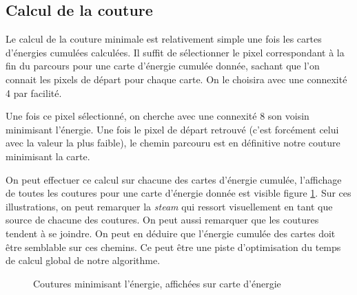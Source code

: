 \documentclass[a4paper]{article}
\begin{document}
\subsection{Calcul de la couture}

Le calcul de la couture minimale est relativement simple une fois les cartes d'énergies cumulées calculées. 
Il suffit de sélectionner le pixel correspondant à la fin du parcours pour une carte d'énergie cumulée donnée,
sachant que l'on connait les pixels de départ pour chaque carte. On le choisira avec une connexité 4 par
facilité.

Une fois ce pixel sélectionné, on cherche avec une connexité 8 son voisin minimisant l'énergie.
Une fois le pixel de départ retrouvé (c'est forcément celui avec la valeur la plus faible), le chemin
parcouru est en définitive notre couture minimisant la carte.

On peut effectuer ce calcul sur chacune des cartes d'énergie cumulée, l'affichage de toutes les coutures pour
une carte d'énergie donnée est visible figure \ref{allseams}. Sur ces illustrations, on peut remarquer la
{\em steam} qui ressort visuellement en tant que source de chacune des coutures.
On peut aussi remarquer que les coutures tendent à se joindre. On peut en déduire que l'énergie
cumulée des cartes doit être semblable sur ces chemins. Ce peut être une piste d'optimisation du temps de
calcul global de notre algorithme.

\begin{figure}[!ht]%
    \centering
    \hspace{0.030\textwidth}
    \caption{Coutures minimisant l'énergie, affichées sur carte d'énergie}
    \label{allseams}
\end{figure}
\end{document}
